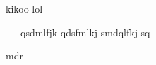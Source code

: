\documentclass{article}
\begin{document}
kikoo lol
\par
{
\ \ \ qsdmlfjk qdsfmlkj smdqlfkj sq
}\par
mdr
\end{document}
